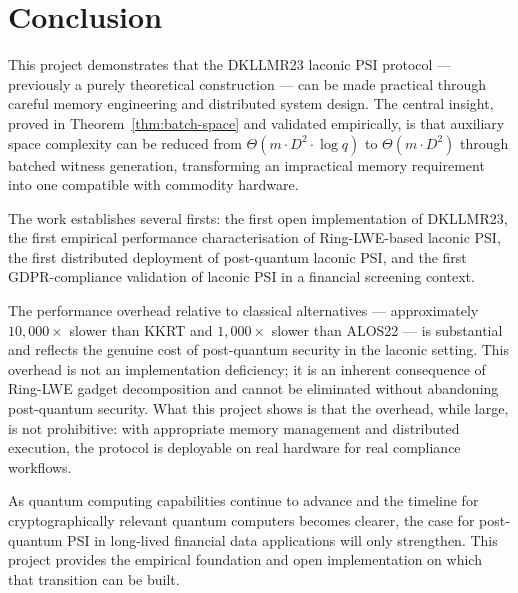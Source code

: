 \section{Conclusion}

This project demonstrates that the DKLLMR23 laconic PSI protocol --- previously a
purely theoretical construction --- can be made practical through careful memory
engineering and distributed system design. The central insight, proved in
Theorem~\ref{thm:batch-space} and validated empirically, is that auxiliary space complexity can be
reduced from $\Theta(m \cdot D^2 \cdot \log q)$ to $\Theta(m \cdot D^2)$ through
batched witness generation, transforming an impractical memory requirement into
one compatible with commodity hardware.

The work establishes several firsts: the first open implementation of DKLLMR23,
the first empirical performance characterisation of Ring-LWE-based laconic PSI,
the first distributed deployment of post-quantum laconic PSI, and the first
GDPR-compliance validation of laconic PSI in a financial screening context.

The performance overhead relative to classical alternatives --- approximately
$10{,}000\times$ slower than KKRT and $1{,}000\times$ slower than ALOS22 --- is
substantial and reflects the genuine cost of post-quantum security in the laconic
setting. This overhead is not an implementation deficiency; it is an inherent
consequence of Ring-LWE gadget decomposition and cannot be eliminated without
abandoning post-quantum security. What this project shows is that the overhead,
while large, is not prohibitive: with appropriate memory management and distributed
execution, the protocol is deployable on real hardware for real compliance workflows.

As quantum computing capabilities continue to advance and the timeline for cryptographically
relevant quantum computers becomes clearer, the case for post-quantum PSI in
long-lived financial data applications will only strengthen. This project provides
the empirical foundation and open implementation on which that transition can be built.
